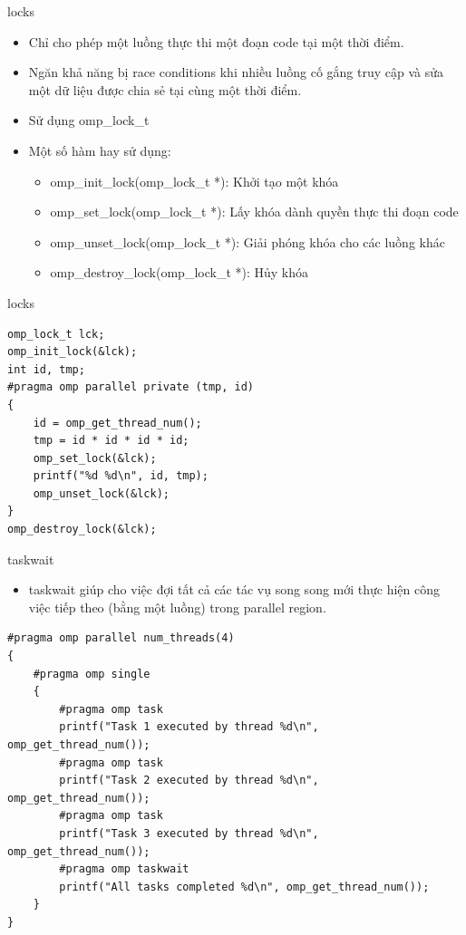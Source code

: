 \documentclass[10pt]{beamer}
\theoremstyle{remark}
\numberwithin{algocf}{section}
\numberwithin{equation}{section}
\numberwithin{dl}{section}
\numberwithin{figure}{section}
\begin{document}
\begin{frame}[fragile]{locks}
    \begin{itemize}
        \item Chỉ cho phép một luồng thực thi một đoạn code tại một thời điểm.
        \item Ngăn khả năng bị race conditions khi nhiều luồng cố gắng truy cập và sửa một dữ liệu được chia sẻ tại cùng một thời điểm.
        \item Sử dụng omp\_lock\_t
        \item Một số hàm hay sử dụng:
        \begin{itemize}
            \item omp\_init\_lock(omp\_lock\_t *): Khởi tạo một khóa
            \item omp\_set\_lock(omp\_lock\_t *): Lấy khóa dành quyền thực thi đoạn code
            \item omp\_unset\_lock(omp\_lock\_t *): Giải phóng khóa cho các luồng khác
            \item omp\_destroy\_lock(omp\_lock\_t *): Hủy khóa
        \end{itemize}
    \end{itemize}
\end{frame}

\begin{frame}[fragile]{locks}
    \begin{verbatim}
omp_lock_t lck;
omp_init_lock(&lck);
int id, tmp;
#pragma omp parallel private (tmp, id)
{
    id = omp_get_thread_num();
    tmp = id * id * id * id;
    omp_set_lock(&lck);
    printf("%d %d\n", id, tmp);
    omp_unset_lock(&lck);
}
omp_destroy_lock(&lck); 
    \end{verbatim}
\end{frame}

\begin{frame}[fragile]{taskwait}
    \begin{itemize}
        \item taskwait giúp cho việc đợi tất cả các tác vụ song song mới thực hiện công việc tiếp theo (bằng một luồng) trong parallel region.
    \end{itemize}

    \begin{verbatim}
#pragma omp parallel num_threads(4)
{
    #pragma omp single
    {
        #pragma omp task
        printf("Task 1 executed by thread %d\n", omp_get_thread_num());
        #pragma omp task
        printf("Task 2 executed by thread %d\n", omp_get_thread_num());
        #pragma omp task
        printf("Task 3 executed by thread %d\n", omp_get_thread_num());
        #pragma omp taskwait
        printf("All tasks completed %d\n", omp_get_thread_num());
    }
}
    \end{verbatim}
\end{frame}
\end{document}
